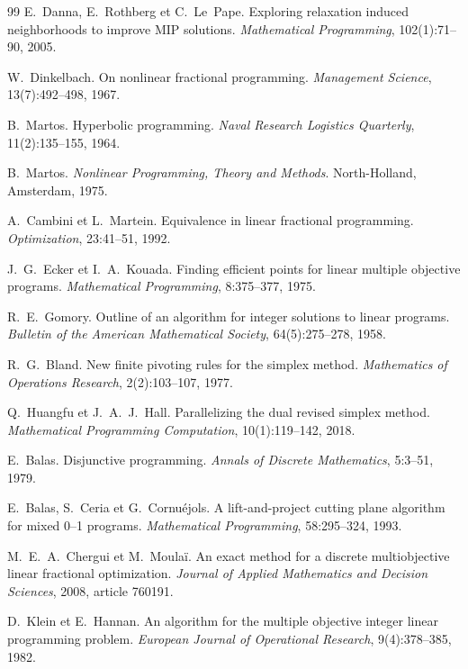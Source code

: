\documentclass[11pt,a4paper]{article}
\theoremstyle{plain}
\theoremstyle{remark}
\begin{document}
\begin{thebibliography}{99}
E.~Danna, E.~Rothberg et C.~Le~Pape.
\newblock Exploring relaxation induced neighborhoods to improve MIP
  solutions.
\newblock \emph{Mathematical Programming}, 102(1):71--90, 2005.

W.~Dinkelbach.
\newblock On nonlinear fractional programming.
\newblock \emph{Management Science}, 13(7):492--498, 1967.

B.~Martos.
\newblock Hyperbolic programming.
\newblock \emph{Naval Research Logistics Quarterly}, 11(2):135--155, 1964.

B.~Martos.
\newblock \emph{Nonlinear Programming, Theory and Methods}.
\newblock North-Holland, Amsterdam, 1975.

A.~Cambini et L.~Martein.
\newblock Equivalence in linear fractional programming.
\newblock \emph{Optimization}, 23:41--51, 1992.

J.~G.~Ecker et I.~A.~Kouada.
\newblock Finding efficient points for linear multiple objective programs.
\newblock \emph{Mathematical Programming}, 8:375--377, 1975.

R.~E.~Gomory.
\newblock Outline of an algorithm for integer solutions to linear programs.
\newblock \emph{Bulletin of the American Mathematical Society},
  64(5):275--278, 1958.

R.~G.~Bland.
\newblock New finite pivoting rules for the simplex method.
\newblock \emph{Mathematics of Operations Research}, 2(2):103--107, 1977.

Q.~Huangfu et J.~A.~J.~Hall.
\newblock Parallelizing the dual revised simplex method.
\newblock \emph{Mathematical Programming Computation}, 10(1):119--142, 2018.

E.~Balas.
\newblock Disjunctive programming.
\newblock \emph{Annals of Discrete Mathematics}, 5:3--51, 1979.

E.~Balas, S.~Ceria et G.~Cornuéjols.
\newblock A lift-and-project cutting plane algorithm for mixed 0--1 programs.
\newblock \emph{Mathematical Programming}, 58:295--324, 1993.

M.~E.~A.~Chergui et M.~Moulaï.
\newblock An exact method for a discrete multiobjective linear fractional
  optimization.
\newblock \emph{Journal of Applied Mathematics and Decision Sciences}, 2008,
  article 760191.

D.~Klein et E.~Hannan.
\newblock An algorithm for the multiple objective integer linear programming
  problem.
\newblock \emph{European Journal of Operational Research}, 9(4):378--385, 1982.


\end{thebibliography}
\end{document}
